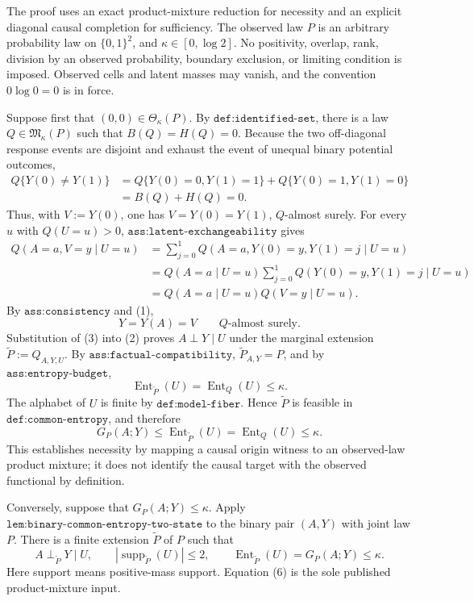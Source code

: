 The proof uses an exact product-mixture reduction for necessity and an explicit diagonal causal completion for sufficiency. The observed law \(P\) is an arbitrary probability law on \(\{0,1\}^2\), and \(\kappa\in[0,\log 2]\). No positivity, overlap, rank, division by an observed probability, boundary exclusion, or limiting condition is imposed. Observed cells and latent masses may vanish, and the convention \(0\log 0=0\) is in force.

Suppose first that \((0,0)\in\Theta_\kappa(P)\). By \(\texttt{def:identified-set}\), there is a law \(Q\in\mathfrak M_\kappa(P)\) such that \(B(Q)=H(Q)=0\). Because the two off-diagonal response events are disjoint and exhaust the event of unequal binary potential outcomes,
\[
\begin{aligned}
Q\{Y(0)\neq Y(1)\}
&=Q\{Y(0)=0,Y(1)=1\}+Q\{Y(0)=1,Y(1)=0\}\\
&=B(Q)+H(Q)=0.
\end{aligned}
\tag{1}
\]
Thus, with \(V:=Y(0)\), one has \(V=Y(0)=Y(1)\), \(Q\)-almost surely. For every \(u\) with \(Q(U=u)>0\), \(\texttt{ass:latent-exchangeability}\) gives
\[
\begin{aligned}
Q(A=a,V=y\mid U=u)
&=\sum_{j=0}^1 Q(A=a,Y(0)=y,Y(1)=j\mid U=u)\\
&=Q(A=a\mid U=u)
  \sum_{j=0}^1Q(Y(0)=y,Y(1)=j\mid U=u)\\
&=Q(A=a\mid U=u)Q(V=y\mid U=u).
\end{aligned}
\tag{2}
\]
By \(\texttt{ass:consistency}\) and (1),
\[
Y=Y(A)=V\qquad Q\text{-almost surely}.
\tag{3}
\]
Substitution of (3) into (2) proves \(A\perp Y\mid U\) under the marginal extension \(\widetilde P:=Q_{A,Y,U}\). By \(\texttt{ass:factual-compatibility}\), \(\widetilde P_{A,Y}=P\), and by \(\texttt{ass:entropy-budget}\),
\[
\operatorname{Ent}_{\widetilde P}(U)=\operatorname{Ent}_Q(U)\leq\kappa.
\tag{4}
\]
The alphabet of \(U\) is finite by \(\texttt{def:model-fiber}\). Hence \(\widetilde P\) is feasible in \(\texttt{def:common-entropy}\), and therefore
\[
G_P(A;Y)\leq\operatorname{Ent}_{\widetilde P}(U)
=\operatorname{Ent}_Q(U)\leq\kappa.
\tag{5}
\]
This establishes necessity by mapping a causal origin witness to an observed-law product mixture; it does not identify the causal target with the observed functional by definition.

Conversely, suppose that \(G_P(A;Y)\leq\kappa\). Apply \(\texttt{lem:binary-common-entropy-two-state}\) to the binary pair \((A,Y)\) with joint law \(P\). There is a finite extension \(\widetilde P\) of \(P\) such that
\[
A\perp_{\widetilde P}Y\mid U,
\qquad
|\operatorname{supp}_{\widetilde P}(U)|\leq2,
\qquad
\operatorname{Ent}_{\widetilde P}(U)=G_P(A;Y)\leq\kappa.
\tag{6}
\]
Here support means positive-mass support. Equation (6) is the sole published product-mixture input.

